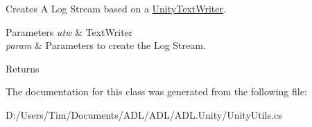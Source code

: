 Creates A Log Stream based on a \mbox{\hyperlink{class_a_d_l_1_1_unity_1_1_unity_text_writer}{Unity\+Text\+Writer}}. 


\begin{DoxyParams}{Parameters}
{\em utw} & Text\+Writer\\
\hline
{\em param} & Parameters to create the Log Stream.\\
\hline
\end{DoxyParams}
\begin{DoxyReturn}{Returns}

\end{DoxyReturn}


The documentation for this class was generated from the following file\+:\begin{DoxyCompactItemize}
\item 
D\+:/\+Users/\+Tim/\+Documents/\+A\+D\+L/\+A\+D\+L/\+A\+D\+L.\+Unity/Unity\+Utils.\+cs\end{DoxyCompactItemize}
